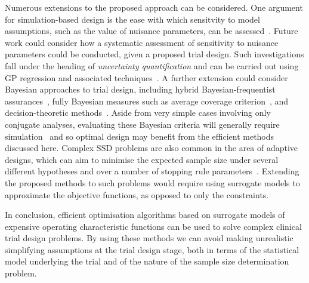 \documentclass[]{sagej}
\begin{document}
Numerous extensions to the proposed approach can be considered. One argument for simulation-based design is the ease with which sensitvity to model assumptions, such as the value of nuisance parameters, can be assessed~\cite{Landau2013}. Future work could consider how a systematic assessment of sensitivity to nuisance parameters could be conducted, given a proposed trial design. Such investigations fall under the heading of \emph{uncertainty quantification} and can be carried out using GP regression and associated techniques~\cite{Kennedy2001}. A further extension could consider Bayesian approaches to trial design, including hybrid Bayesian-frequentist assurances~\cite{OHagan2005}, fully Bayesian measures such as average coverage criterion~\cite{Cao2009}, and decision-theoretic methods~\cite{Oakley2010}. Aside from very simple cases involving only conjugate analyses, evaluating these Bayesian criteria will generally require simulation~\cite{OHagan2005} and so optimal design may benefit from the efficient methods discussed here. Complex SSD problems are also common in the area of adaptive designs, which can aim to minimise the expected sample size under several different hypotheses and over a number of stopping rule parameters~\cite{Wason2011, Wason2012}.  Extending the proposed methods to such problems would require using surrogate models to approximate the objective functions, as opposed to only the constraints.

In conclusion, efficient optimisation algorithms based on surrogate models of expensive operating characteristic functions can be used to solve complex clinical trial design problems. By using these methods we can avoid making unrealistic simplifying assumptions at the trial design stage, both in terms of the statistical model underlying the trial and of the nature of the sample size determination problem.




\end{document}
